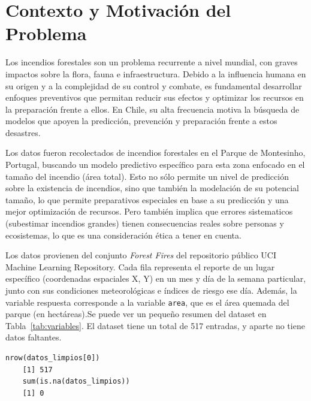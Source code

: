 

\section{Contexto y Motivación del Problema}
Los incendios forestales son un problema recurrente a nivel mundial, con graves impactos sobre la flora, fauna e infraestructura. Debido a la influencia humana en su origen y a la complejidad de su control y combate, es fundamental desarrollar enfoques preventivos que permitan reducir sus efectos y optimizar los recursos en la preparación frente a ellos. En Chile, su alta frecuencia motiva la búsqueda de modelos que apoyen la predicción, prevención y preparación frente a estos desastres.

Los datos fueron recolectados de incendios forestales en el Parque de Montesinho, Portugal, buscando un modelo predictivo específico para esta zona enfocado en el tamaño del incendio (área total). Esto no sólo permite un nivel de predicción sobre la existencia de incendios, sino que también la modelación de su potencial tamaño, lo que permite preparativos especiales en base a su predicción  y una mejor optimización de recursos. Pero también implica que errores sistematicos (subestimar incendios grandes) tienen consecuencias reales sobre personas y ecosistemas, lo que es una consideración ética a tener en cuenta.

Los datos provienen del conjunto \textit{Forest Fires} del repositorio público UCI Machine Learning Repository. Cada fila representa el reporte de un lugar específico (coordenadas espaciales X, Y) en un mes y día de la semana particular, junto con sus condiciones meteorológicas e índices de riesgo ese día. Además, la variable respuesta corresponde a la variable \texttt{area}, que es el área quemada del parque (en hectáreas).Se puede ver un pequeño resumen del dataset en Tabla~\ref{tab:variables}. El dataset tiene un total de 517 entradas, y aparte no tiene datos faltantes.

\begin{lstlisting}[caption={Tamaño muestral y datos faltantes}, label={lst:summary}]
    nrow(datos_limpios[0])
    [1] 517
    sum(is.na(datos_limpios))
    [1] 0
\end{lstlisting}

